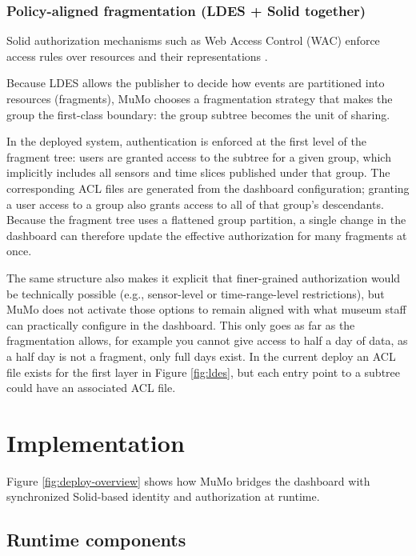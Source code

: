 \documentclass{ceurart}
\begin{document}
\subsubsection{Policy-aligned fragmentation (LDES + Solid
together)}\label{policy-aligned-fragmentation-ldes-solid-together}

Solid authorization mechanisms such as Web Access Control (WAC) enforce
access rules over resources and their representations
\citep{solidprotocol2022, wac}.

Because LDES allows the publisher to decide how events are partitioned
into resources (fragments), MuMo chooses a fragmentation strategy that
makes the group the first-class boundary: the group subtree becomes the
unit of sharing.

In the deployed system, authentication is enforced at the first level of
the fragment tree: users are granted access to the subtree for a given
group, which implicitly includes all sensors and time slices published
under that group. The corresponding ACL files are generated from the
dashboard configuration; granting a user access to a group also grants
access to all of that group's descendants. Because the fragment tree
uses a flattened group partition, a single change in the dashboard can
therefore update the effective authorization for many fragments at once.

The same structure also makes it explicit that finer-grained
authorization would be technically possible (e.g., sensor-level or
time-range-level restrictions), but MuMo does not activate those options
to remain aligned with what museum staff can practically configure in
the dashboard. This only goes as far as the fragmentation allows, for
example you cannot give access to half a day of data, as a half day is
not a fragment, only full days exist. In the current deploy an ACL file
exists for the first layer in Figure \ref{fig:ldes}, but each entry
point to a subtree could have an associated ACL file.

\section{Implementation}\label{sec:implementation}

Figure \ref{fig:deploy-overview} shows how MuMo bridges the dashboard
with synchronized Solid-based identity and authorization at runtime.

\subsection{Runtime components}\label{runtime-components}
\end{document}
